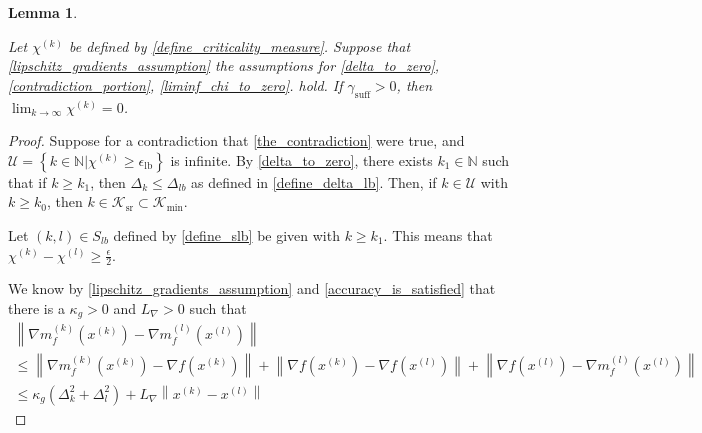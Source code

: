 \documentclass{article}
\newtheorem{lemma}[theorem]{Lemma}
\theoremstyle{case}
\numberwithin{theorem}{subsection}
\newcommand{\chik}{{\chi^{(k)}}}
\newcommand{\dk}{\Delta_k}
\newcommand{\dl}{\Delta_l}
\newcommand{\gammabi}{\gamma_{\textrm{suff}}}
\newcommand{\gammasm}{\gamma_{\textrm{min}}}
\newcommand{\gk}{{\nabla m_f^{(k)}\left(\xk\right)}}
\newcommand{\gl}{{\nabla m_f^{(l)}\left(\xl\right)}}
\newcommand{\gradf}{\nabla f}
\newcommand{\lipgrad}{{L_{\nabla}}}
\newcommand{\maxhessian}{{M_{\nabla^2}}}
\newcommand{\naturals}{\mathbb N}
\newcommand{\xk}{x^{(k)}}
\newcommand{\xl}{{x^{(l)}}}
\newcommand{\miniterates}{{\mathcal K_{\textrm{min}}}}
\newcommand{\reduceiterates}{{\mathcal K_{\textrm{sr}}}}
\begin{document}
\begin{lemma}
\label{lim_chi_to_zero}

Let $\chik$ be defined by \cref{define_criticality_measure}.
Suppose that 
\cref{lipschitz_gradients_assumption}
the assumptions for 
\cref{delta_to_zero},
\cref{contradiction_portion},
\cref{liminf_chi_to_zero}.
hold.
If $\gammabi > 0$, then $\lim_{k\to\infty}\chik=0$.
\end{lemma}


\begin{proof}
Suppose for a contradiction that \cref{the_contradiction} were true, and $\mathcal U = \left\{k \in \naturals | \chik \ge \epsilon_{\textrm{lb}} \right\}$ is infinite.
By \cref{delta_to_zero}, there exists $k_1 \in \naturals$ such that if $k \ge k_1$, then $\dk \le \Delta_{lb}$ as defined in \cref{define_delta_lb}.
Then, if $k \in \mathcal U$ with $k \ge k_0$, then $k \in \reduceiterates \subset \miniterates$.

Let $(k, l) \in S_{lb}$ defined by \cref{define_slb} be given with $k \ge k_1$.
This means that $\chik - \chi^{(l)} \ge \frac {\epsilon} 2 $.

We know by \cref{lipschitz_gradients_assumption} and \cref{accuracy_is_satisfied} that there is a $\kappa_g > 0$ and $\lipgrad>0$ such that
\begin{align}
\left\|\gk - \gl\right\| \nonumber \\
\le \left\|\gk - \gradf\left(\xk\right)\right\| 
+ \left\|\gradf\left(\xk\right) - \gradf\left(\xl\right)\right\| 
+ \left\|\gradf\left(\xl\right) - \gl \right\| \nonumber \\
\le \kappa_g \left(\dk^2 + \dl^2\right) + \lipgrad \left\|\xk - \xl \right\| \label{chi2zero2_comp1}
\end{align}



\end{proof}
\end{document}
